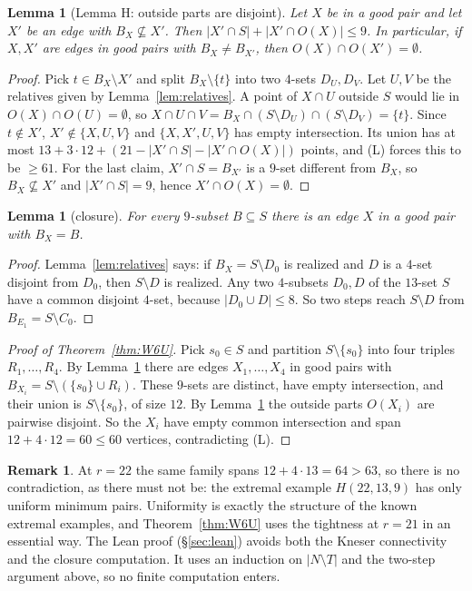 \documentclass[11pt]{amsart}
\newtheorem{lemma}[theorem]{Lemma}
\theoremstyle{definition}
\newtheorem{remark}[theorem]{Remark}
\begin{document}
\begin{lemma}[Lemma H: outside parts are disjoint]\label{lem:H}
Let $X$ be in a good pair and let $X'$ be an edge with $B_X\not\subseteq X'$. Then $|X'\cap S|+|X'\cap O(X)|\le 9$. In particular, if $X,X'$ are edges in good pairs with $B_X\ne B_{X'}$, then $O(X)\cap O(X')=\emptyset$.
\end{lemma}
\begin{proof}
Pick $t\in B_X\setminus X'$ and split $B_X\setminus\{t\}$ into two $4$-sets $D_U,D_V$. Let $U,V$ be the relatives given by Lemma~\ref{lem:relatives}. A point of $X\cap U$ outside $S$ would lie in $O(X)\cap O(U)=\emptyset$, so $X\cap U\cap V=B_X\cap(S\setminus D_U)\cap(S\setminus D_V)=\{t\}$. Since $t\notin X'$, $X'\notin\{X,U,V\}$ and $\{X,X',U,V\}$ has empty intersection. Its union has at most $13+3\cdot12+(21-|X'\cap S|-|X'\cap O(X)|)$ points, and (L) forces this to be $\ge 61$. For the last claim, $X'\cap S=B_{X'}$ is a $9$-set different from $B_X$, so $B_X\not\subseteq X'$ and $|X'\cap S|=9$, hence $X'\cap O(X)=\emptyset$.
\end{proof}

\begin{lemma}[closure]\label{lem:closure}
For every $9$-subset $B\subseteq S$ there is an edge $X$ in a good pair with $B_X=B$.
\end{lemma}
\begin{proof}
Lemma~\ref{lem:relatives} says: if $B_X=S\setminus D_0$ is realized and $D$ is a $4$-set disjoint from $D_0$, then $S\setminus D$ is realized. Any two $4$-subsets $D_0,D$ of the $13$-set $S$ have a common disjoint $4$-set, because $|D_0\cup D|\le 8$. So two steps reach $S\setminus D$ from $B_{E_1}=S\setminus C_0$.
\end{proof}

\begin{proof}[Proof of Theorem~\ref{thm:W6U}]
Pick $s_0\in S$ and partition $S\setminus\{s_0\}$ into four triples $R_1,\dots,R_4$. By Lemma~\ref{lem:closure} there are edges $X_1,\dots,X_4$ in good pairs with $B_{X_i}=S\setminus(\{s_0\}\cup R_i)$. These $9$-sets are distinct, have empty intersection, and their union is $S\setminus\{s_0\}$, of size $12$. By Lemma~\ref{lem:H} the outside parts $O(X_i)$ are pairwise disjoint. So the $X_i$ have empty common intersection and span $12+4\cdot 12=60\le 60$ vertices, contradicting (L).
\end{proof}

\begin{remark}
At $r=22$ the same family spans $12+4\cdot13=64>63$, so there is no contradiction, as there must not be: the extremal example $H(22,13,9)$ has only uniform minimum pairs. Uniformity is exactly the structure of the known extremal examples, and Theorem~\ref{thm:W6U} uses the tightness at $r=21$ in an essential way. The Lean proof (\S\ref{sec:lean}) avoids both the Kneser connectivity and the closure computation. It uses an induction on $|N\setminus T|$ and the two-step argument above, so no finite computation enters.
\end{remark}
\end{document}
